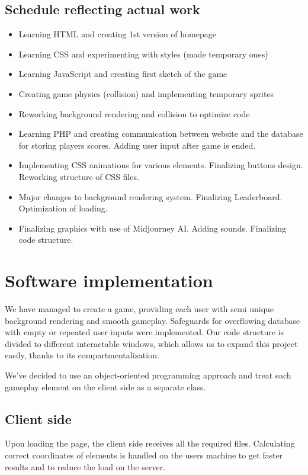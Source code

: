 \documentclass[oneside,a4paper,11pt]{report}
\begin{document}
\section{Schedule reflecting actual work}
\begin{itemize}
	\item Learning HTML and creating 1st version of homepage
	\item Learning CSS and experimenting with styles (made temporary ones)
	\item Learning JavaScript and creating first sketch of the game
	\item Creating game physics (collision) and implementing temporary sprites
	\item Reworking background rendering and collision to optimize code
	\item Learning PHP and creating communication between website and the database for storing players scores. Adding user input after game is ended.
	\item Implementing CSS animations for various elements. Finalizing buttons design. Reworking structure of CSS files.
	\item Major changes to background rendering system. Finalizing Leaderboard. Optimization of loading.
	\item Finalizing graphics with use of Midjourney AI. Adding sounds. Finalizing code structure.
\end{itemize}


\chapter{Software implementation}

We have managed to create a game, providing each user with semi unique background rendering and smooth gameplay.
Safeguards for overflowing database with empty or repeated user inputs were implemented.
Our code structure is divided to different interactable windows, which allows us to expand this project easily, thanks to its compartmentalization.

\par
We've decided to use an object-oriented programming approach and treat each gameplay element on the client side as a separate class.

\section{Client side}

Upon loading the page, the client side receives all the required files. Calculating correct coordinates of elements is handled on the users machine to get faster results and to reduce the load on the server.
\end{document}
